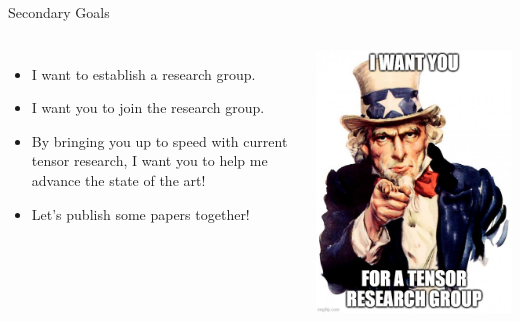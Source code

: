 \documentclass[handout]{beamer}
\begin{document}
\begin{frame}{Secondary Goals}
    \begin{columns}
    \begin{itemize}
        \item I want to establish a research group.
        \item I want you to join the research group.
        \item By bringing you up to speed with current tensor research, I want you to help me advance the state of the art!
        \item Let's publish some papers together!
    \end{itemize}
        \begin{center}
        \includegraphics[max width=\textwidth, max height=0.65\textheight]{images/tensor-recruit}
        \end{center}
    \end{columns}
\end{frame}
\end{document}
